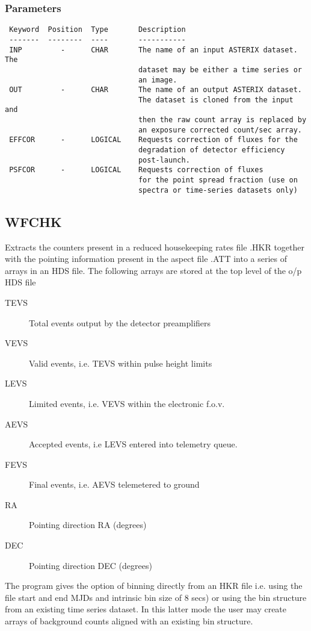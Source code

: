\documentclass{book}
\renewcommand{\_}{{\tt\char'137}}     %
\begin{document}
\subsubsection{Parameters}
\begin{verbatim}
 Keyword  Position  Type       Description
 -------  --------  ----       -----------
 INP         -      CHAR       The name of an input ASTERIX dataset. The
                               dataset may be either a time series or
                               an image.
 OUT         -      CHAR       The name of an output ASTERIX dataset.
                               The dataset is cloned from the input and
                               then the raw count array is replaced by
                               an exposure corrected count/sec array.
 EFFCOR      -      LOGICAL    Requests correction of fluxes for the
                               degradation of detector efficiency
                               post-launch.
 PSFCOR      -      LOGICAL    Requests correction of fluxes
                               for the point spread fraction (use on
                               spectra or time-series datasets only)
\end{verbatim}\subsection{WFCHK}
Extracts the counters present in a reduced housekeeping rates file
.HKR together with the pointing information present in the aspect
file .ATT into a series of arrays in an HDS file.
The following arrays are stored at the top level of the o/p HDS file
 
\begin{description}
\item[TEVS]
Total events output by the detector preamplifiers
\item[VEVS]
Valid events, i.e. TEVS within pulse height limits
\item[LEVS]
Limited events, i.e. VEVS within the electronic f.o.v.
\item[AEVS]
Accepted events, i.e LEVS entered into telemetry queue.
\item[FEVS]
Final events, i.e. AEVS telemetered to ground
\item[RA]
Pointing direction RA (degrees)
\item[DEC]
Pointing direction DEC (degrees)
\end{description}
The program gives the option of binning directly from an HKR file {i.e.}
using the file start and end MJDs and intrinsic bin size of 8 secs) or
using the bin structure from an existing time series dataset.
In this latter mode the user may create arrays of background counts
aligned with an existing bin structure.
 
\end{document}
